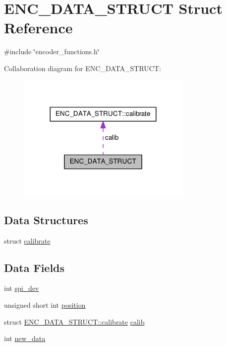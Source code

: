 \hypertarget{structENC__DATA__STRUCT}{\section{E\-N\-C\-\_\-\-D\-A\-T\-A\-\_\-\-S\-T\-R\-U\-C\-T Struct Reference}
\label{structENC__DATA__STRUCT}
}


{\ttfamily \#include \char`\"{}encoder\-\_\-functions.\-h\char`\"{}}



Collaboration diagram for E\-N\-C\-\_\-\-D\-A\-T\-A\-\_\-\-S\-T\-R\-U\-C\-T\-:
\nopagebreak
\begin{figure}[H]
\begin{center}
\leavevmode
\includegraphics[width=240pt]{structENC__DATA__STRUCT__coll__graph}
\end{center}
\end{figure}
\subsection*{Data Structures}
\begin{DoxyCompactItemize}
\item 
struct \hyperlink{structENC__DATA__STRUCT_1_1calibrate}{calibrate}
\end{DoxyCompactItemize}
\subsection*{Data Fields}
\begin{DoxyCompactItemize}
\item 
int \hyperlink{structENC__DATA__STRUCT_a93b8e925392a12a8874bf59f2a1cd76a}{spi\-\_\-dev}
\item 
unsigned short int \hyperlink{structENC__DATA__STRUCT_ac3a53ed44ecaf87285518a091e1d2c24}{position}
\item 
struct \hyperlink{structENC__DATA__STRUCT_1_1calibrate}{E\-N\-C\-\_\-\-D\-A\-T\-A\-\_\-\-S\-T\-R\-U\-C\-T\-::calibrate} \hyperlink{structENC__DATA__STRUCT_af227e5bbb714b830cc570432bda0a468}{calib}
\item 
int \hyperlink{structENC__DATA__STRUCT_adbfb6e5764f0e3c42f4e212deb5d1f21}{new\-\_\-data}
\end{DoxyCompactItemize}


